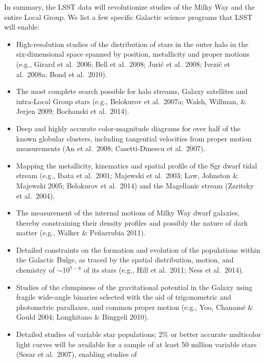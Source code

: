  

In summary, the LSST data will revolutionize studies of the Milky Way and the entire Local Group. We list a few specific 
Galactic science programs that LSST will enable:

\begin{itemize}
\item High-resolution studies of the distribution of stars in the outer halo
          in the six-dimensional space spanned by position, metallicity and proper
          motions (e.g., Girard et al.~2006; Bell et al.~2008; Juri\'{c} et al.~2008;
          Ivezi\'{c} et al.~2008a; Bond et al.~2010).
\item The most complete search possible for halo streams, Galaxy satellites and intra-Local Group 
          stars (e.g., Belokurov et al.~2007a; Walsh, Willman, \& Jerjen 2009; Bochanski et al.~2014).
\item Deep and highly accurate color-magnitude diagrams for over half of the known
          globular clusters, including tangential velocities from proper motion
          measurements (An et al.~2008; Casetti-Dinescu et al.~2007).
\item Mapping the metallicity, kinematics and spatial profile of the Sgr dwarf tidal
          stream (e.g., Ibata et al.~2001; Majewski et al.~2003; Law, Johnston \& Majewski 2005; Belokurov et al.~2014) 
          and the Magellanic stream (Zaritsky et al.~2004).
\item The measurement of the internal motions of Milky Way dwarf 
          galaxies, thereby constraining their density profiles and
	  possibly the nature of dark matter (e.g., Walker \&
	  Pe{\~n}arrubia 2011). 
\item Detailed constraints on the formation and evolution of the populations within the Galactic Bulge, as traced by the spatial 
          distribution, motion, and chemistry of $\sim$10$^{7-8}$ of its stars (e.g., Hill et al.~2011; Ness et al.~2014).
\item Studies of the clumpiness of the gravitational potential in the Galaxy using
          fragile wide-angle binaries selected with the aid of trigonometric and
          photometric parallaxes, and common proper motion (e.g., Yoo, Chanam\'{e} \& Gould 2004; Longhitano \& Binggeli 2010).
\item Detailed studies of variable star populations; 2\% or better accurate
          multicolor light curves will be available for a sample of at least 50
          million variable stars (Sesar et al.~2007), enabling studies of

\end{itemize}

